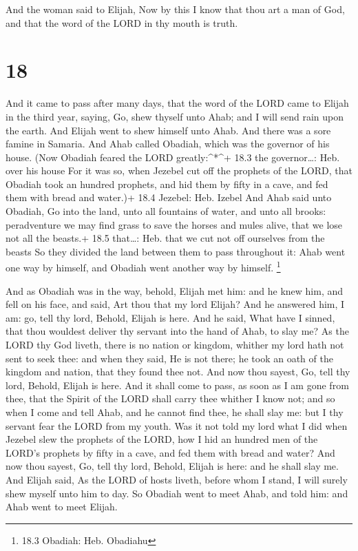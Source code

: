 And the woman said to Elijah, Now by this I know that thou
art a man of God, and that the word of the LORD in thy mouth is truth.

\hypertarget{section-17}{%
\section{18}\label{section-17}}

 And it came to pass after many days, that the word of the
LORD came to Elijah in the third year, saying, Go, shew thyself unto
Ahab; and I will send rain upon the earth.  And Elijah went
to shew himself unto Ahab. And there was a sore famine in Samaria.
 And Ahab called Obadiah, which was the governor of his
house. (Now Obadiah feared the LORD greatly:\^{}*\^{}+ 18.3 the
governor\ldots: Heb. over his house  For it was so, when
Jezebel cut off the prophets of the LORD, that Obadiah took an hundred
prophets, and hid them by fifty in a cave, and fed them with bread and
water.)+ 18.4 Jezebel: Heb. Izebel  And Ahab said unto
Obadiah, Go into the land, unto all fountains of water, and unto all
brooks: peradventure we may find grass to save the horses and mules
alive, that we lose not all the beasts.+ 18.5 that\ldots: Heb. that we
cut not off ourselves from the beasts  So they divided the
land between them to pass throughout it: Ahab went one way by himself,
and Obadiah went another way by himself. \footnote{18.3 Obadiah: Heb.
  Obadiahu}

 And as Obadiah was in the way, behold, Elijah met him: and
he knew him, and fell on his face, and said, Art thou that my lord
Elijah?  And he answered him, I am: go, tell thy lord,
Behold, Elijah is here.  And he said, What have I sinned,
that thou wouldest deliver thy servant into the hand of Ahab, to slay
me?  As the LORD thy God liveth, there is no nation or
kingdom, whither my lord hath not sent to seek thee: and when they said,
He is not there; he took an oath of the kingdom and nation, that they
found thee not.  And now thou sayest, Go, tell thy lord,
Behold, Elijah is here.  And it shall come to pass, as soon
as I am gone from thee, that the Spirit of the LORD shall carry thee
whither I know not; and so when I come and tell Ahab, and he cannot find
thee, he shall slay me: but I thy servant fear the LORD from my youth.
 Was it not told my lord what I did when Jezebel slew the
prophets of the LORD, how I hid an hundred men of the LORD's prophets by
fifty in a cave, and fed them with bread and water?  And
now thou sayest, Go, tell thy lord, Behold, Elijah is here: and he shall
slay me.  And Elijah said, As the LORD of hosts liveth,
before whom I stand, I will surely shew myself unto him to day.
 So Obadiah went to meet Ahab, and told him: and Ahab went
to meet Elijah.

